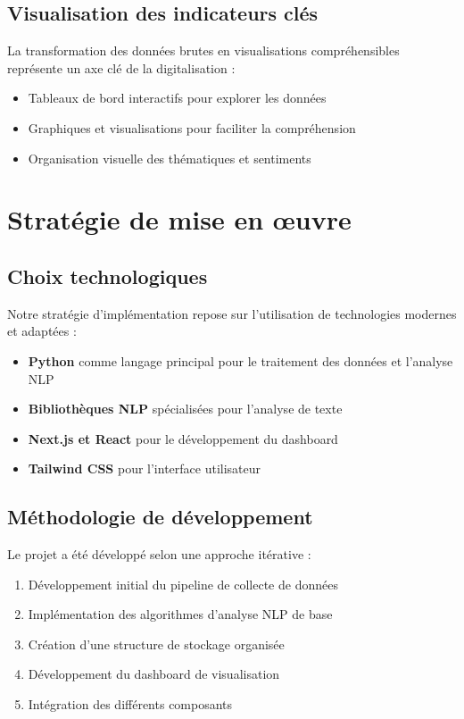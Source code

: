 \documentclass[12pt,a4paper]{report}
\begin{document}
\section{Visualisation des indicateurs clés}
La transformation des données brutes en visualisations compréhensibles représente un axe clé de la digitalisation :
\begin{itemize}
    \item Tableaux de bord interactifs pour explorer les données
    \item Graphiques et visualisations pour faciliter la compréhension
    \item Organisation visuelle des thématiques et sentiments
\end{itemize}

\chapter{Stratégie de mise en œuvre}

\section{Choix technologiques}
Notre stratégie d'implémentation repose sur l'utilisation de technologies modernes et adaptées :
\begin{itemize}
    \item \textbf{Python} comme langage principal pour le traitement des données et l'analyse NLP
    \item \textbf{Bibliothèques NLP} spécialisées pour l'analyse de texte
    \item \textbf{Next.js et React} pour le développement du dashboard
    \item \textbf{Tailwind CSS} pour l'interface utilisateur
\end{itemize}

\section{Méthodologie de développement}
Le projet a été développé selon une approche itérative :
\begin{enumerate}
    \item Développement initial du pipeline de collecte de données
    \item Implémentation des algorithmes d'analyse NLP de base
    \item Création d'une structure de stockage organisée
    \item Développement du dashboard de visualisation
    \item Intégration des différents composants
\end{enumerate}
\end{document}
